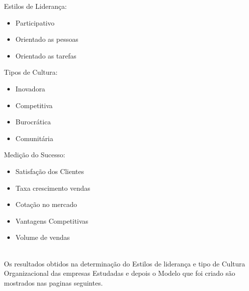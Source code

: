 {\begin{minipage}[t]{.3\linewidth}
\quad Estilos de Liderança:
\begin{itemize}
\item Participativo
\item Orientado as pessoas
\item Orientado as tarefas
\end{itemize}
\end{minipage}
\begin{minipage}[t]{.3\linewidth}
\quad Tipos de Cultura:
\begin{itemize}
\item Inovadora
\item Competitiva
\item Burocrática
\item Comunitária
\end{itemize}
\end{minipage}
\begin{minipage}[t]{.3\linewidth}
\quad Medição do Sucesso:
\begin{itemize}
\item Satisfação dos Clientes
\item Taxa crescimento vendas
\item Cotação no mercado
\item Vantagens Competitivas
\item Volume de vendas
\end{itemize}
\end{minipage}
\vspace{2cm}\\

Os resultados obtidos na determinação do Estilos de liderança e tipo de Cultura Organizacional das empresas Estudadas e depois o Modelo que foi criado são mostrados nas paginas seguintes.\\

}
